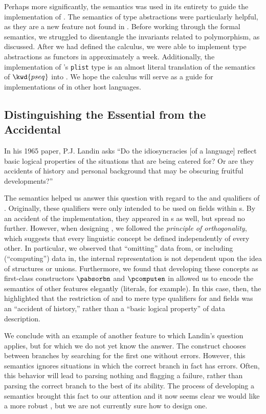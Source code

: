 Perhaps more significantly, the semantics was used in its entirety to guide the implementation of \padsml{}. The semantics of type abstractions were particularly helpful, as they are a new feature not found in \padsc{}. Before working through the formal semantics, we struggled to disentangle the invariants related to polymorphism, as discussed. After we had defined the calculus, we were able to implement type abstractions as \ocaml{} functors in approximately a week.  Additionally, the implementation of \padsml{}'s \texttt{plist} type is an almost literal translation of the semantics of $\kwd{pseq}$ into \ocaml{}.
We hope the calculus will serve as a guide for implementations of \pads{} in other host languages.

\subsection{Distinguishing the Essential from the Accidental}

In his 1965 paper, P.J. Landin asks ``Do the idiosyncracies [of a
language] reflect basic logical properties of the situations that are
being catered for?  Or are they accidents of history and personal
background that may be obscuring fruitful developments?''  

The semantics helped us answer this question with regard to the
\Pomit{} and \Pcompute{} qualifiers of \padsc{}.  Originally, these
qualifiers were only intended to be used on fields within \Pstruct{}s.
By an accident of the implementation, they appeared in \Punion{}s as
well, but spread no further. However, when designing \ddc{}, we
followed the {\em principle of orthogonality}, which suggests that
every linguistic concept be defined independently of every other.  In
particular, we observed that ``omitting'' data from, or including
(``computing'') data in, the internal representation is not dependent
upon the idea of structures or unions.  Furthermore, we found that
developing these concepts as first-class constructors $\pabsorbn$ and
$\pcomputen$ in \ddc{} allowed us to encode the semantics of other
\padsc{} features elegantly (literals, for example).  In this case, then, the
\ddc{} highlighted that the restriction of \Pomit{} and \Pcompute{} to
mere type qualifiers for \Punion{} and \Pstruct{} fields was an
``accident of history,'' rather than a ``basic logical property'' of
data description.

We conclude with an example of another feature to which Landin's
question applies, but for which we do not yet know the answer. The \Punion{}
construct chooses between branches by searching for the first one
without errors. However, this semantics ignores situations in which
the correct branch in fact has errors. Often, this behavior will lead
to parsing nothing and flagging a failure, rather than parsing the
correct branch to the best of its ability.  The process of
developing a semantics brought this fact to our attention and
it now seems clear we would like a more robust
\Punion, but we are not currently sure how to design one. 

